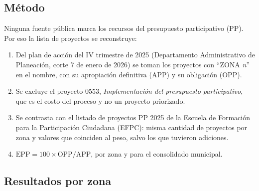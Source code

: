 \documentclass[11pt,letterpaper]{article}
\begin{document}
\subsection{Método}
Ninguna fuente pública marca los recursos del presupuesto participativo (PP). Por eso la lista de proyectos se reconstruye:
\begin{enumerate}
\item Del plan de acción del IV trimestre de 2025 (Departamento Administrativo de Planeación, corte 7 de enero de 2026) se toman los proyectos con ``ZONA \emph{n}'' en el nombre, con su apropiación definitiva (APP) y su obligación (OPP).
\item Se excluye el proyecto 0553, \emph{Implementación del presupuesto participativo}, que es el costo del proceso y no un proyecto priorizado.
\item Se contrasta con el listado de proyectos PP 2025 de la Escuela de Formación para la Participación Ciudadana (EFPC): misma cantidad de proyectos por zona y valores que coinciden al peso, salvo los que tuvieron adiciones.
\item $\mathrm{EPP} = 100 \times \mathrm{OPP} / \mathrm{APP}$, por zona y para el consolidado municipal.
\end{enumerate}


\subsection{Resultados por zona}
\end{document}
